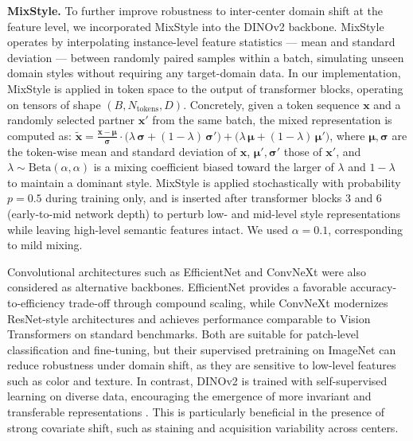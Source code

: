 \documentclass{midl}
\begin{document}
\textbf{MixStyle.} To further improve robustness to inter-center domain shift at the feature level, we incorporated MixStyle \cite{zhou2021mixstyle} into the DINOv2 backbone. MixStyle operates by interpolating instance-level feature statistics --- mean and standard deviation --- between randomly paired samples within a batch, simulating unseen domain styles without requiring any target-domain data. In our implementation, MixStyle is applied in token space to the output of transformer blocks, operating on tensors of shape $(B, N_\text{tokens}, D)$. Concretely, given a token sequence $\mathbf{x}$ and a randomly selected partner $\mathbf{x}'$ from the same batch, the mixed representation is computed as: $\tilde{\mathbf{x}} = \frac{\mathbf{x} - \boldsymbol{\mu}}{\boldsymbol{\sigma}} \cdot \bigl(\lambda\,\boldsymbol{\sigma} + (1-\lambda)\,\boldsymbol{\sigma}'\bigr) + \bigl(\lambda\,\boldsymbol{\mu} + (1-\lambda)\,\boldsymbol{\mu}'\bigr)$,
where $\boldsymbol{\mu}, \boldsymbol{\sigma}$ are the token-wise mean and standard deviation of $\mathbf{x}$, $\boldsymbol{\mu}', \boldsymbol{\sigma}'$ those of $\mathbf{x}'$, and $\lambda \sim \mathrm{Beta}(\alpha, \alpha)$ is a mixing coefficient biased toward the larger of $\lambda$ and $1-\lambda$ to maintain a dominant style. MixStyle is applied stochastically with probability $p = 0.5$ during training only, and is inserted after transformer blocks 3 and 6 (early-to-mid network depth) to perturb low- and mid-level style representations while leaving high-level semantic features intact. We used $\alpha = 0.1$, corresponding to mild mixing.

Convolutional architectures such as EfficientNet \cite{tan2019efficientnet} and ConvNeXt \cite{liu2022convnet} were also considered as alternative backbones. EfficientNet provides a favorable accuracy-to-efficiency trade-off through compound scaling, while ConvNeXt modernizes ResNet-style architectures and achieves performance comparable to Vision Transformers on standard benchmarks. Both are suitable for patch-level classification and fine-tuning, but their supervised pretraining on ImageNet can reduce robustness under domain shift, as they are sensitive to low-level features such as color and texture. In contrast, DINOv2 is trained with self-supervised learning on diverse data, encouraging the emergence of more invariant and transferable representations \cite{oquab2023dinov2}. This is particularly beneficial in the presence of strong covariate shift, such as staining and acquisition variability across centers.
\end{document}
